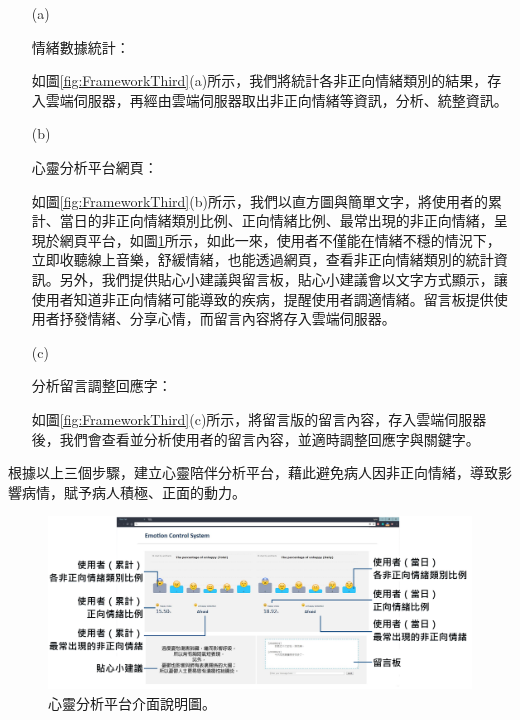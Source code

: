 \documentclass[12pt]{scrreprt}
\begin{document}
\begin{itemize}
\item[(a)]{\begin{bfseries}{情緒數據統計：}\end{bfseries}}如圖\ref{fig:FrameworkThird}(a)所示，我們將統計各非正向情緒類別的結果，存入雲端伺服器，再經由雲端伺服器取出非正向情緒等資訊，分析、統整資訊。

\item[(b)]{\begin{bfseries}{心靈分析平台網頁：}\end{bfseries}}如圖\ref{fig:FrameworkThird}(b)所示，我們以直方圖與簡單文字，將使用者的累計、當日的非正向情緒類別比例、正向情緒比例、最常出現的非正向情緒，呈現於網頁平台，如圖\ref{fig:WebInterface}所示，如此一來，使用者不僅能在情緒不穩的情況下，立即收聽線上音樂，舒緩情緒，也能透過網頁，查看非正向情緒類別的統計資訊。另外，我們提供貼心小建議與留言板，貼心小建議會以文字方式顯示，讓使用者知道非正向情緒可能導致的疾病，提醒使用者調適情緒。留言板提供使用者抒發情緒、分享心情，而留言內容將存入雲端伺服器。

\item[(c)]{\begin{bfseries}{分析留言調整回應字：}\end{bfseries}}如圖\ref{fig:FrameworkThird}(c)所示，將留言版的留言內容，存入雲端伺服器後，我們會查看並分析使用者的留言內容，並適時調整回應字與關鍵字。
\end{itemize}

根據以上三個步驟，建立心靈陪伴分析平台，藉此避免病人因非正向情緒，導致影響病情，賦予病人積極、正面的動力。\\

\begin{figure}[!h]
\begin{center}
\includegraphics[width=1\textwidth]{./figs/Web.pdf}
\end{center}
\caption{心靈分析平台介面說明圖。}
\label{fig:WebInterface}
\end{figure}
\end{document}
